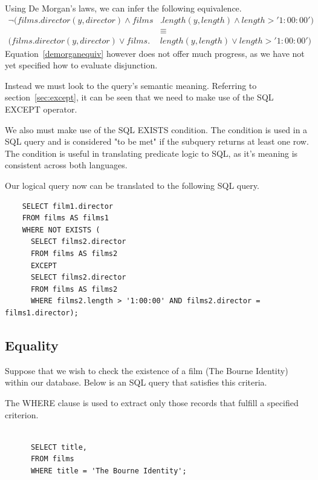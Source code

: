 \documentclass[a4paper, 11pt]{article}
\begin{document}
    Using De Morgan's laws, we can infer the following
    equivalence.
    \begin{align}
      \lnot(films.director(y, director) \land films&.length(y, length) \land length > '1:00:00')     \label{demorganequiv} \\
                                                        &\equiv                                            \nonumber\\
      (films.director(y, director) \lor films.&length(y, length) \lor length > '1:00:00')                  \nonumber
    \end{align}
    Equation~\ref{demorganequiv} however does not offer much progress, as
    we have not yet specified how to evaluate disjunction.

    Instead we must look to the query's semantic meaning. Referring to
    section~\ref{sec:except}, it can be seen that we need to make use of the
    SQL EXCEPT operator.

    We also must make use of the SQL EXISTS condition. The condition
    is used in a SQL query and is considered "to be met" if the subquery
    returns at least one row.\cite{technetEXISTS} The condition is useful in
    translating predicate logic to SQL, as it's meaning is consistent across
    both languages. 

    Our logical query now can be translated to the following SQL query.
    \begin{verbatim}
    SELECT film1.director
    FROM films AS films1
    WHERE NOT EXISTS (
      SELECT films2.director
      FROM films AS films2
      EXCEPT
      SELECT films2.director
      FROM films AS films2
      WHERE films2.length > '1:00:00' AND films2.director = films1.director);
    \end{verbatim}

    \subsection{Equality}

      Suppose that we wish to check the existence of a film (The Bourne
      Identity) within our database. Below is an SQL query that satisfies this
      criteria.

      The WHERE clause is used to extract only those records that fulfill a
      specified criterion.~\cite{w3WHERE} 


      \begin{verbatim}

      SELECT title,
      FROM films
      WHERE title = 'The Bourne Identity';

      \end{verbatim}
\end{document}
